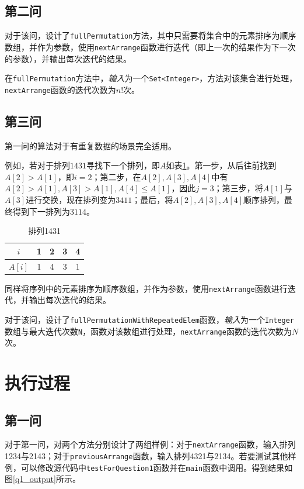 \documentclass[11pt]{homework}
\begin{document}
  \subsection*{第二问}
  对于该问，设计了\verb|fullPermutation|方法，其中只需要将集合中的元素排序为顺序数组，并作为参数，使用\verb|nextArrange|函数进行迭代（即上一次的结果作为下一次的参数），并输出每次迭代的结果。

  在\verb|fullPermutation|方法中，\emph{输入}为一个\verb|Set<Integer>|，方法对该集合进行处理，\verb|nextArrange|函数的迭代次数为$n!$次。

  \subsection*{第三问}
  第一问的算法对于有重复数据的场景完全适用。

  例如，若对于排列$1431$寻找下一个排列，即$A$如表\ref{1431}。第一步，从后往前找到$A[2] > A[1]$，即$i = 2$；第二步，在$A[2], A[3], A[4]$中有$A[2] > A[1], A[3]> A[1], A[4]\leq A[1]$，因此$j = 3$；第三步，将$A[1]$与$A[3]$进行交换，现在排列变为$3411$；最后，将$A[2], A[3], A[4]$顺序排列，最终得到下一排列为$3114$。
  \begin{table}[]
    \centering
    \begin{tabular}{|c|c|c|c|c|}
    \hline
    $i$    & 1 & 2 & 3 & 4 \\ \hline
    $A[i]$ & 1 & 4 & 3 & 1 \\ \hline
    \end{tabular}
    \caption{排列1431}
    \label{1431}
  \end{table}

  同样将序列中的元素排序为顺序数组，并作为参数，使用\verb|nextArrange|函数进行迭代，并输出每次迭代的结果。

  对于该问，设计了\verb|fullPermutationWithRepeatedElem|函数，\emph{输入}为一个\verb|Integer|数组与最大迭代次数\verb|N|，函数对该数组进行处理，\verb|nextArrange|函数的迭代次数为$N$次。

\section*{执行过程}

  \subsection*{第一问}
  对于第一问，对两个方法分别设计了两组样例：对于\verb|nextArrange|函数，输入排列1234与2143；对于\verb|previousArrange|函数，输入排列4321与2134。若要测试其他样例，可以修改源代码中\verb|testForQuestion1|函数并在\verb|main|函数中调用。得到结果如图\ref{q1_output}所示。
\end{document}
